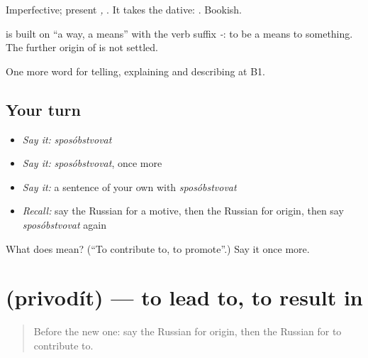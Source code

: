 Imperfective; present \emph{, }. It takes the dative: \emph{ }. Bookish.

\begin{cousinweb}
\textbf{} is built on \emph{} \textquotedblleft{}a way, a means\textquotedblright{} with the verb suffix \emph{-}: to be a means to something. The further origin of \emph{} is not settled.
\end{cousinweb}

\begin{grammarlens}[title={What you've built}]
One more word for telling, explaining and describing at B1.
\end{grammarlens}

\subsection*{Your turn}
\begin{itemize}
\raggedright
  \item \emph{Say it:} \emph{sposóbstvovat}
  \item \emph{Say it:} \emph{sposóbstvovat}, once more
  \item \emph{Say it:} a sentence of your own with \emph{sposóbstvovat}
  \item \emph{Recall:} say the Russian for a motive, then the Russian for origin, then say \emph{sposóbstvovat} again
\end{itemize}

\begin{tcolorbox}[breakable,colback=teal!4,colframe=teal!35!black,title={Before you move on}]
What does  mean? (\textquotedblleft{}To contribute to, to promote\textquotedblright{}.) Say it once more.
\end{tcolorbox}
\section[\texorpdfstring{\ru{приводить} (privodít)}{приводить (privodít)}]{ (privodít) — to lead to, to result in}

\label{lesson:RU-C349-privodit}



\begin{quote}
Before the new one: say the Russian for origin, then the Russian for to contribute to.
\end{quote}

